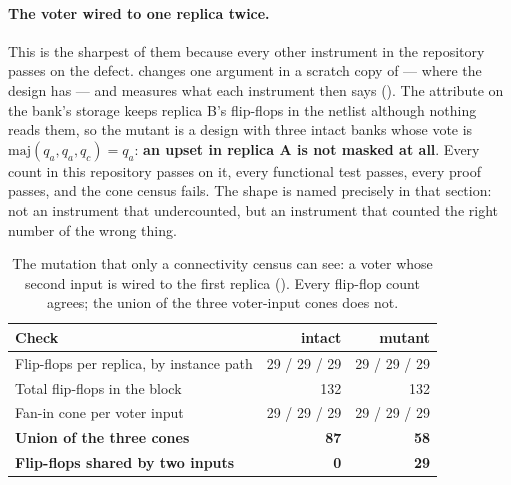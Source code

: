 \paragraph{The voter wired to one replica twice.} This is the sharpest
of them because every other instrument in the repository passes on the
defect. 
changes one argument in a scratch copy of  ---
 where the design has  --- and
 measures what each instrument then says
(). The  attribute on the bank's
storage keeps replica B's flip-flops in the netlist although nothing
reads them, so the mutant is a design with three intact banks whose vote
is $\mathrm{maj}(q_a, q_a, q_c) = q_a$: \textbf{an upset in replica A is
not masked at all}. Every count in this repository passes on it, every
functional test passes, every proof passes, and the cone census fails.
The shape is named precisely in that section: not an instrument that
undercounted, but an instrument that counted the right number of the
wrong thing.

\begin{table}[tbp]
\centering
\caption{The mutation that only a connectivity census can see: a voter
whose second input is wired to the first replica
(). Every flip-flop count agrees; the union of
the three voter-input cones does not.}
\label{tab:verif-cone}
\small
\begin{tabular}{@{}lrr@{}}
\toprule
Check & intact & mutant \\
\midrule
Flip-flops per replica, by instance path & 29 / 29 / 29 & 29 / 29 / 29 \\
Total flip-flops in the block            & 132          & 132 \\
Fan-in cone per voter input              & 29 / 29 / 29 & 29 / 29 / 29 \\
\textbf{Union of the three cones}        & \textbf{87}  & \textbf{58} \\
\textbf{Flip-flops shared by two inputs} & \textbf{0}   & \textbf{29} \\
\bottomrule
\end{tabular}
\end{table}

